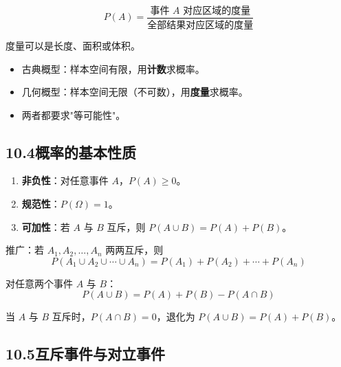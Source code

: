 \documentclass[12pt, a4paper]{ctexart}
\begin{document}
\begin{knowledgebox}[几何概型概率公式]
\[
P(A) = \frac{\text{事件 } A \text{ 对应区域的度量}}{\text{全部结果对应区域的度量}}
\]

度量可以是长度、面积或体积。
\end{knowledgebox}

\begin{warnbox}[古典概型与几何概型的比较]
\begin{itemize}
  \item 古典概型：样本空间有限，用\textbf{计数}求概率。
  \item 几何概型：样本空间无限（不可数），用\textbf{度量}求概率。
  \item 两者都要求"等可能性"。
\end{itemize}
\end{warnbox}

\subsection*{10.4\quad 概率的基本性质}

\begin{knowledgebox}[概率的基本性质]
\begin{enumerate}[label=(\arabic*)]
  \item \textbf{非负性}：对任意事件 $A$，$P(A) \geqslant 0$。
  \item \textbf{规范性}：$P(\Omega) = 1$。
  \item \textbf{可加性}：若 $A$ 与 $B$ 互斥，则 $P(A \cup B) = P(A) + P(B)$。
\end{enumerate}

推广：若 $A_1, A_2, \ldots, A_n$ 两两互斥，则
\[
P(A_1 \cup A_2 \cup \cdots \cup A_n) = P(A_1) + P(A_2) + \cdots + P(A_n)
\]
\end{knowledgebox}

\begin{knowledgebox}
对任意两个事件 $A$ 与 $B$：
\[
P(A \cup B) = P(A) + P(B) - P(A \cap B)
\]

当 $A$ 与 $B$ 互斥时，$P(A \cap B) = 0$，退化为 $P(A \cup B) = P(A) + P(B)$。
\end{knowledgebox}

\subsection*{10.5\quad 互斥事件与对立事件}
\end{document}
